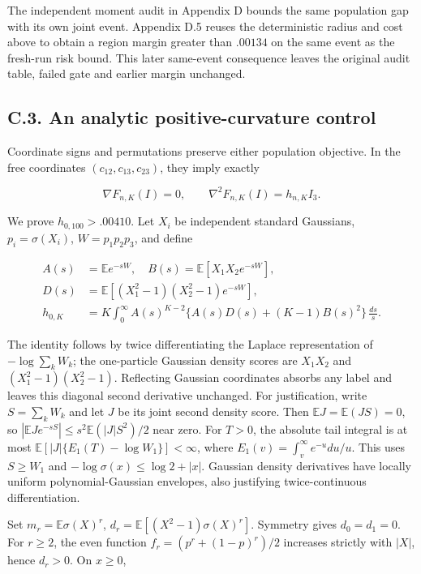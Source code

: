 \documentclass{article}
\begin{document}
The independent moment audit in Appendix D bounds the same population
gap with its own joint event. Appendix D.5 reuses the deterministic
radius and cost above to obtain a region margin greater than \(.00134\)
on the same event as the fresh-run risk bound. This later same-event
consequence leaves the original audit table, failed gate and earlier
margin unchanged.

\subsection*{C.3. An analytic positive-curvature
control}\label{c.3.-an-analytic-positive-curvature-control}

Coordinate signs and permutations preserve either population objective.
In the free coordinates \((c_{12},c_{13},c_{23})\), they imply exactly

\[
\nabla F_{n,K}(I)=0,\qquad\nabla^2F_{n,K}(I)=h_{n,K}I_3.
\tag{C.8}
\]

We prove \(h_{0,100}>.00410\). Let \(X_i\) be independent standard
Gaussians, \(p_i=\sigma(X_i)\), \(W=p_1p_2p_3\), and define

\[
\begin{aligned}
A(s)&=\mathbb E e^{-sW},\quad B(s)=\mathbb E[X_1X_2e^{-sW}],\\
D(s)&=\mathbb E[(X_1^2-1)(X_2^2-1)e^{-sW}],\\
h_{0,K}&=K\int_0^\infty A(s)^{K-2}\{A(s)D(s)+(K-1)B(s)^2\}\,\frac{ds}{s}.
\end{aligned}
\tag{C.9}
\]

The identity follows by twice differentiating the Laplace representation
of \(-\log\sum_kW_k\); the one-particle Gaussian density scores are
\(X_1X_2\) and \((X_1^2-1)(X_2^2-1)\). Reflecting Gaussian coordinates
absorbs any label and leaves this diagonal second derivative unchanged.
For justification, write \(S=\sum_kW_k\) and let \(J\) be its joint
second density score. Then \(\mathbb EJ=\mathbb E(JS)=0\), so
\(|\mathbb EJe^{-sS}|\le s^2\mathbb E(|J|S^2)/2\) near zero. For
\(T>0\), the absolute tail integral is at most
\(\mathbb E[|J|\{E_1(T)-\log W_1\}]<\infty\), where
\(E_1(v)=\int_v^\infty e^{-u}du/u\). This uses \(S\ge W_1\) and
\(-\log\sigma(x)\le\log2+|x|\). Gaussian density derivatives have
locally uniform polynomial-Gaussian envelopes, also justifying
twice-continuous differentiation.

Set \(m_r=\mathbb E\sigma(X)^r\), \(d_r=\mathbb E[(X^2-1)\sigma(X)^r]\).
Symmetry gives \(d_0=d_1=0\). For \(r\ge2\), the even function
\(f_r=(p^r+(1-p)^r)/2\) increases strictly with \(|X|\), hence
\(d_r>0\). On \(x\ge0\),
\end{document}
